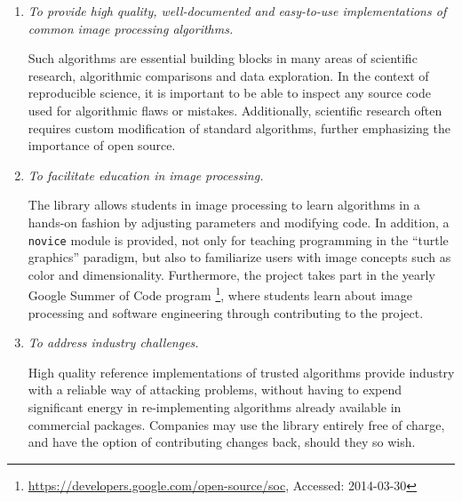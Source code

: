   \begin{enumerate}
    \item  %
      \textit{To provide high quality, well-documented and easy-to-use implementations of common image processing algorithms.}

      Such algorithms are essential building blocks in many areas of scientific research, algorithmic comparisons and data exploration. In the context of reproducible science, it is important to be able to inspect any source code used for algorithmic flaws or mistakes. Additionally, scientific research often requires custom modification of standard algorithms, further emphasizing the importance of open source.

    \item  %
      \textit{To facilitate education in image processing.}

      The library allows students in image processing to learn algorithms in a hands-on fashion by adjusting parameters and modifying code. In addition, a \texttt{novice} module is provided, not only for teaching programming in the ``turtle graphics'' paradigm, but also to familiarize users with image concepts such as color and dimensionality. Furthermore, the project takes part in the yearly Google Summer of Code program \footnote{\url{https://developers.google.com/open-source/soc}, Accessed: 2014-03-30}, where students learn about image processing and software engineering through contributing to the project.

    \item  %
      \textit{To address industry challenges.}

      High quality reference implementations of trusted algorithms provide industry with a reliable way of attacking problems, without having to expend significant energy in re-implementing algorithms already available in commercial packages.  Companies may use the library entirely free of charge, and have the option of contributing changes back, should they so wish.
  \end{enumerate}
